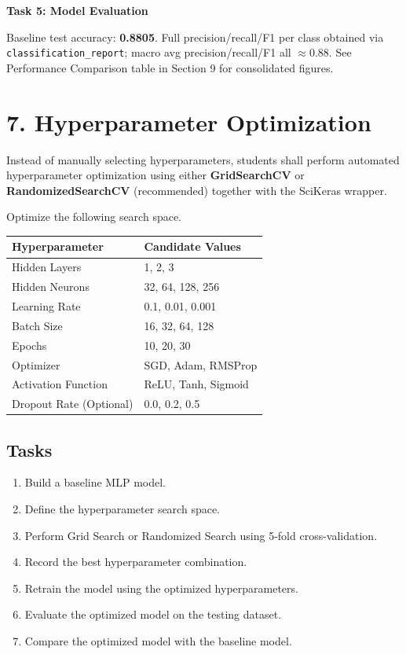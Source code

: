 \documentclass[11pt]{article}
\begin{document}
\bigskip

\textbf{Task 5: Model Evaluation}

Baseline test accuracy: \textbf{0.8805}. Full precision/recall/F1 per class obtained via \texttt{classification\_report}; macro avg precision/recall/F1 all $\approx 0.88$. See Performance Comparison table in Section 9 for consolidated figures.

\section*{7. Hyperparameter Optimization}

Instead of manually selecting hyperparameters, students shall perform automated hyperparameter optimization using either \textbf{GridSearchCV} or \textbf{RandomizedSearchCV} (recommended) together with the SciKeras wrapper.

Optimize the following search space.

\begin{center}
\begin{tabular}{|p{5cm}|p{7cm}|}
\hline
Hyperparameter & Candidate Values\\
\hline
Hidden Layers & 1, 2, 3\\
Hidden Neurons & 32, 64, 128, 256\\
Learning Rate & 0.1, 0.01, 0.001\\
Batch Size & 16, 32, 64, 128\\
Epochs & 10, 20, 30\\
Optimizer & SGD, Adam, RMSProp\\
Activation Function & ReLU, Tanh, Sigmoid\\
Dropout Rate (Optional) & 0.0, 0.2, 0.5\\
\hline
\end{tabular}
\end{center}

\subsection*{Tasks}

\begin{enumerate}
\item Build a baseline MLP model.
\item Define the hyperparameter search space.
\item Perform Grid Search or Randomized Search using 5-fold cross-validation.
\item Record the best hyperparameter combination.
\item Retrain the model using the optimized hyperparameters.
\item Evaluate the optimized model on the testing dataset.
\item Compare the optimized model with the baseline model.
\end{enumerate}
\end{document}
